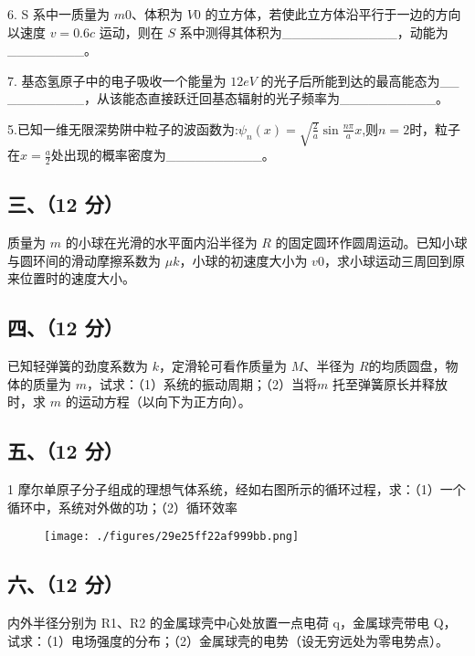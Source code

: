 6. S 系中一质量为 $m0$、体积为 $V0$ 的立方体，若使此立方体沿平行于一边的方向以速度 $v=0.6c$ 运动，则在 $S$ 系中测得其体积为____________，动能为________。

7. 基态氢原子中的电子吸收一个能量为 $12eV$ 的光子后所能到达的最高能态为__
________，从该能态直接跃迁回基态辐射的光子频率为__________。

5.已知一维无限深势阱中粒子的波函数为:$\psi_n(x)=\sqrt{\frac{2}{a}}\sin\frac{n\pi}{a}x$,则$n=2$时，粒子在$x=\frac{a}{2}$处出现的概率密度为__________。
\subsection{三、（12 分）}
质量为 $m$ 的小球在光滑的水平面内沿半径为 $R$ 的固定圆环作圆周运动。已知小球与圆环间的滑动摩擦系数为 $\mu k$，小球的初速度大小为 $v0$，求小球运动三周回到原来位置时的速度大小。
\subsection{四、（12 分）}
已知轻弹簧的劲度系数为 $k$，定滑轮可看作质量为 $M$、半径为 $R$的均质圆盘，物体的质量为 $m$，试求：（1）系统的振动周期；（2）当将$m$ 托至弹簧原长并释放时，求 $m$ 的运动方程（以向下为正方向）。
\subsection{五、（12 分）}
1 摩尔单原子分子组成的理想气体系统，经如右图所示的循环过程，求：（1）一个循环中，系统对外做的功；（2）循环效率
\begin{figure}[ht]
\centering
\texttt{[image: ./figures/29e25ff22af999bb.png]}
\caption{} \label{fig_NJU05_1}
\end{figure}
\subsection{六、（12 分）}
内外半径分别为 R1、R2 的金属球壳中心处放置一点电荷 q，金属球壳带电 Q，试求：（1）电场强度的分布；（2）金属球壳的电势（设无穷远处为零电势点）。